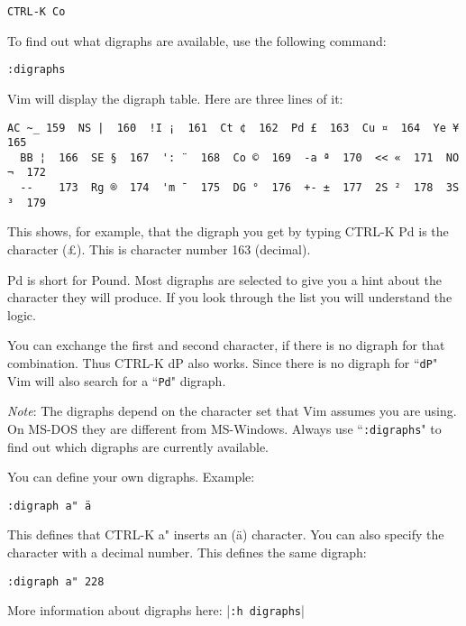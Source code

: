 \begin{Verbatim}[samepage=true]
 CTRL-K Co
\end{Verbatim}

To find out what digraphs are available, use the following command:

\begin{Verbatim}[samepage=true]
 :digraphs
\end{Verbatim}

Vim will display the digraph table.
Here are three lines of it:

\begin{Verbatim}[samepage=true]
  AC ~_ 159  NS |  160  !I ¡  161  Ct ¢  162  Pd £  163  Cu ¤  164  Ye ¥  165
  BB ¦  166  SE §  167  ': ¨  168  Co ©  169  -a ª  170  << «  171  NO ¬  172
  --    173  Rg ®  174  'm ¯  175  DG °  176  +- ±  177  2S ²  178  3S ³  179 
\end{Verbatim}
 
This shows, for example, that the digraph you get by typing CTRL-K Pd is the character (£).
This is character number 163 (decimal).

Pd is short for Pound.
Most digraphs are selected to give you a hint about the character they will produce.
If you look through the list you will understand the logic.

You can exchange the first and second character, if there is no digraph for that combination.
Thus CTRL-K dP also works.
Since there is no digraph for ``\texttt{dP}" Vim will also search for a ``\texttt{Pd}" digraph.

\emph{Note}: The digraphs depend on the character set that Vim assumes you are using.
On MS-DOS they are different from MS-Windows.
Always use ``\texttt{:digraphs}" to find out which digraphs are currently available.

You can define your own digraphs.  Example:

\begin{Verbatim}[samepage=true]
 :digraph a" ä
\end{Verbatim}

This defines that CTRL-K a" inserts an (ä) character.
You can also specify the character with a decimal number.
This defines the same digraph:

\begin{Verbatim}[samepage=true]
 :digraph a" 228
\end{Verbatim}

More information about digraphs here: |\texttt{:h digraphs}|

